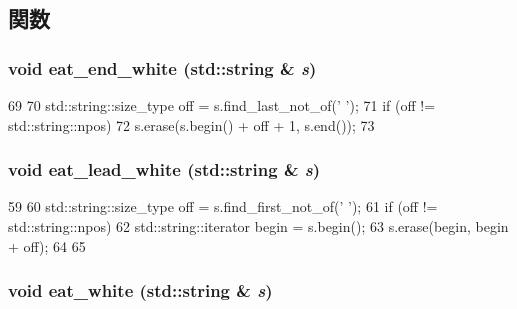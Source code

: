 \subsection{関数}
\hypertarget{str_8hh_af45c9e4bdc7b8be0a63dac2972f74188}{
\subsubsection[{eat\_\-end\_\-white}]{\setlength{\rightskip}{0pt plus 5cm}void eat\_\-end\_\-white (std::string \& {\em s})}}
\label{str_8hh_af45c9e4bdc7b8be0a63dac2972f74188}



\begin{DoxyCode}
69 {
70     std::string::size_type off = s.find_last_not_of(' ');
71     if (off != std::string::npos)
72         s.erase(s.begin() + off + 1, s.end());
73 }
\end{DoxyCode}
\hypertarget{str_8hh_ac540cdd701bba93f6061b0772f132cc6}{
\subsubsection[{eat\_\-lead\_\-white}]{\setlength{\rightskip}{0pt plus 5cm}void eat\_\-lead\_\-white (std::string \& {\em s})}}
\label{str_8hh_ac540cdd701bba93f6061b0772f132cc6}



\begin{DoxyCode}
59 {
60     std::string::size_type off = s.find_first_not_of(' ');
61     if (off != std::string::npos) {
62         std::string::iterator begin = s.begin();
63         s.erase(begin, begin + off);
64     }
65 }
\end{DoxyCode}
\hypertarget{str_8hh_ac53e62953cefb749b9d3a80eba3084b4}{
\subsubsection[{eat\_\-white}]{\setlength{\rightskip}{0pt plus 5cm}void eat\_\-white (std::string \& {\em s})}}
\label{str_8hh_ac53e62953cefb749b9d3a80eba3084b4}



